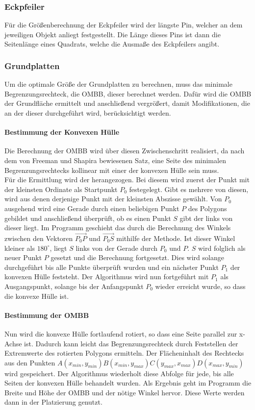 \subsubsection{Eckpfeiler}
Für die Größenberechnung der Eckpfeiler wird der längste Pin, welcher an dem jeweiligen Objekt anliegt festgestellt.
Die Länge dieses Pins ist dann die Seitenlänge eines Quadrats, welche die Ausmaße des Eckpfeilers angibt.
\subsubsection{Grundplatten}
Um die optimale Größe der Grundplatten zu berechnen, muss das minimale Begrenzungsrechteck, die OMBB, dieser berechnet werden.
Dafür wird die OMBB der Grundfläche ermittelt und anschließend vergrößert, damit Modifikationen, die an der dieser durchgeführt wird, berücksichtigt werden.
\paragraph{Bestimmung der Konvexen Hülle}
Die Berechnung der OMBB wird über diesen Zwischenschritt realisiert, da nach dem von Freeman und Shapira bewiesenen Satz, eine Seite des minimalen Begrenzungsrechtecks kollinear mit einer der konvexen Hülle sein muss. \\
Für die Ermittlung wird der  herangezogen.
Bei diesem wird zuerst der Punkt mit der kleinsten Ordinate als Startpunkt $P_0$ festegelegt.
Gibt es mehrere von diesen, wird aus denen derjenige Punkt mit der kleinsten Abszisse gewählt.
Von $P_0$ ausgehend wird eine Gerade durch einen beliebigen Punkt $P$ des Polygons gebildet und anschließend überprüft, ob es einen Punkt $S$ gibt der links von dieser liegt.
Im Programm geschieht das durch die Berechnung des Winkels zwischen den Vektoren $\overrightarrow{{P_0}P}$ und $\overrightarrow{{P_0}S}$ mithilfe der  Methode.
Ist dieser Winkel kleiner als $180^\circ$, liegt $S$ links von der Gerade durch $P_0$ und $P$.
$S$ wird folglich als neuer Punkt $P$ gesetzt und die Berechnung fortgesetzt.
Dies wird solange durchgeführt bis alle Punkte überprüft wurden und ein nächster Punkt $P_1$ der konvexen Hülle feststeht.
Der Algorithmus wird nun fortgeführt mit $P_1$ als Ausgangspunkt, solange bis der Anfangspunkt $P_0$ wieder erreicht wurde, so dass die konvexe Hülle  ist.
\paragraph{Bestimmung der OMBB}
Nun wird die konvexe Hülle fortlaufend rotiert, so dass eine Seite parallel zur x-Achse ist.
Dadurch kann leicht das Begrenzungsrechteck durch Feststellen der Extremwerte des rotierten Polygons ermitteln.
Der Flächeninhalt des Rechtecks aus den Punkten $A(x_{min}, y_{min}) B(x_{min}, y_{max}) C(y_{max}, x_{max}) D(x_{max}, y_{min})$ wird gespeichert.
Der Algorithmus wiederholt diese Abfolge für jede, bis alle Seiten der konvexen Hülle behandelt wurden.
Als Ergebnis geht im Programm die Breite und Höhe der OMBB und der nötige Winkel hervor.
Diese Werte werden dann in der Platzierung genutzt.
